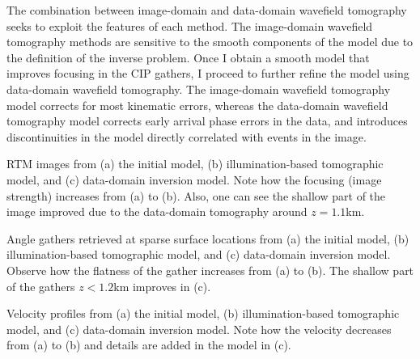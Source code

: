 The combination between image-domain and data-domain wavefield
tomography seeks to exploit the features of each method. The image-domain 
wavefield tomography methods are sensitive to the smooth components
of the model due to the definition of the inverse problem. Once I obtain
 a smooth model that improves focusing in the CIP gathers,
 I proceed to further refine the model using data-domain
 wavefield tomography. The image-domain wavefield tomography
model corrects for most kinematic errors, 
whereas
the data-domain wavefield tomography model 
corrects early arrival phase errors in the data, and
introduces  discontinuities in the model directly correlated with events in 
the image.






%
{RTM images from (a) the initial model, (b) illumination-based tomographic model, and (c) data-domain inversion model.
Note how the focusing (image strength) increases from (a) to (b). Also, one can see the shallow part of the image
improved due to the data-domain tomography around $z=1.1$km.}


%
{Angle gathers retrieved at sparse surface locations from (a) the initial model, (b) illumination-based tomographic model, and (c) data-domain inversion model. Observe how the flatness of the gather increases from (a) to (b). The shallow part of the gathers $z<1.2$km 
improves in (c).}


%
{Velocity profiles from (a) the initial model, (b) illumination-based tomographic model, and (c) data-domain inversion model.
Note how the velocity decreases from (a) to (b) and details are added in the model in (c).}







\newpage
